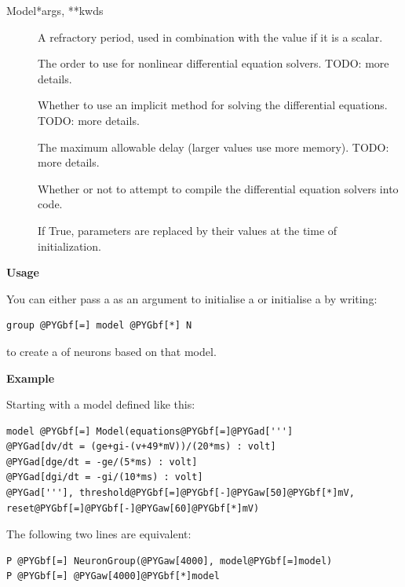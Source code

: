 \documentclass[letterpaper,10pt,english]{manual}
\begin{document}
\begin{classdesc}{Model}{*args, **kwds}
\begin{description}
\item[]
A refractory period, used in combination with the  value
if it is a scalar.

\item[]
The order to use for nonlinear differential equation solvers.
TODO: more details.

\item[]
Whether to use an implicit method for solving the differential
equations. TODO: more details.

\item[]
The maximum allowable delay (larger values use more memory).
TODO: more details.

\item[]
Whether or not to attempt to compile the differential equation
solvers into  code.

\item[]
If True, parameters are replaced by their values at the time
of initialization.

\end{description}

\textbf{Usage}

You can either pass a \hyperlink{brian.Model}{} as an argument to initialise a
\hyperlink{brian.NeuronGroup}{} or initialise a \hyperlink{brian.NeuronGroup}{} by writing:

\begin{Verbatim}[commandchars=@\[\]]
group @PYGbf[=] model @PYGbf[*] N
\end{Verbatim}

to create a \hyperlink{brian.NeuronGroup}{} of  neurons based on that model.

\textbf{Example}

Starting with a model defined like this:

\begin{Verbatim}[commandchars=@\[\]]
model @PYGbf[=] Model(equations@PYGbf[=]@PYGad[''']
@PYGad[dv/dt = (ge+gi-(v+49*mV))/(20*ms) : volt]
@PYGad[dge/dt = -ge/(5*ms) : volt]
@PYGad[dgi/dt = -gi/(10*ms) : volt]
@PYGad['''], threshold@PYGbf[=]@PYGbf[-]@PYGaw[50]@PYGbf[*]mV, reset@PYGbf[=]@PYGbf[-]@PYGaw[60]@PYGbf[*]mV)
\end{Verbatim}

The following two lines are equivalent:

\begin{Verbatim}[commandchars=@\[\]]
P @PYGbf[=] NeuronGroup(@PYGaw[4000], model@PYGbf[=]model)
P @PYGbf[=] @PYGaw[4000]@PYGbf[*]model
\end{Verbatim}
\end{classdesc}
\end{document}
